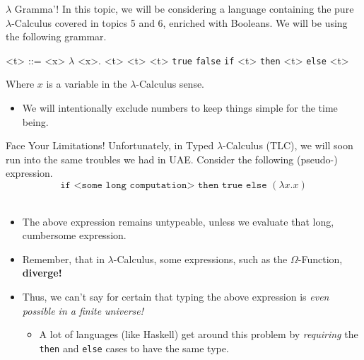\documentclass[11pt]{beamer}
\begin{document}
\begin{frame}[fragile=singleslide]{$\lambda$ Gramma'!}
In this topic, we will be considering a language containing the pure $\lambda$-Calculus covered in topics 5 and 6, enriched with Booleans.  We will be using the following grammar. \\

\dotfill
\begin{grammar}
<t> ::= <x>
\alt $\lambda$ <x>. <t>
\alt <t> <t>
\alt \texttt{true}
\alt \texttt{false}
\alt \texttt{if} <t> \texttt{then} <t> \texttt{else} <t> 
\end{grammar}
\dotfill


Where $x$ is a variable in the $\lambda$-Calculus sense.
\begin{itemize}
\item We will intentionally exclude numbers to keep things simple for the time being.  
\end{itemize}
\end{frame}


\begin{frame}[fragile=singleslide]{Face Your Limitations!}
Unfortunately, in Typed $\lambda$-Calculus (TLC), we will soon run into the same troubles we had in UAE.  Consider the following (pseudo-) expression.\\
\vspace{-0.5em}
\begin{equation}
\texttt{if <some long computation> then true else } (\lambda x.x)
\end{equation} \\ 
\vspace{-0.5em}
\begin{itemize}
\item The above expression remains untypeable, unless we evaluate that long, cumbersome expression.
\item Remember, that in $\lambda$-Calculus, some expressions, such as the $\Omega$-Function, \textbf{diverge!}
\item Thus, we can't say for certain that typing the above expression is \emph{even possible in a finite universe!}
\begin{itemize}
\item A lot of languages (like Haskell) get around this problem by \emph{requiring} the \texttt{then} and \texttt{else} cases to have the same type. 
\end{itemize}
\end{itemize}
\end{frame}
\end{document}
